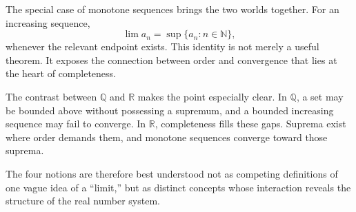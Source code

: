 \documentclass{essay}
\begin{document}
The special case of monotone sequences brings the two worlds together. For an increasing sequence,
\[ \lim a_{n}=\sup\{a_{n}:n\in\mathbb{N}\}, \]
whenever the relevant endpoint exists. This identity is not merely a useful theorem. It exposes the connection between order and convergence that lies at the heart of completeness.

The contrast between \(\mathbb{Q}\) and \(\mathbb{R}\) makes the point especially clear. In \(\mathbb{Q}\), a set may be bounded above without possessing a supremum, and a bounded increasing sequence may fail to converge. In \(\mathbb{R}\), completeness fills these gaps. Suprema exist where order demands them, and monotone sequences converge toward those suprema.

The four notions are therefore best understood not as competing definitions of one vague idea of a ``limit,'' but as distinct concepts whose interaction reveals the structure of the real number system.
\end{document}
